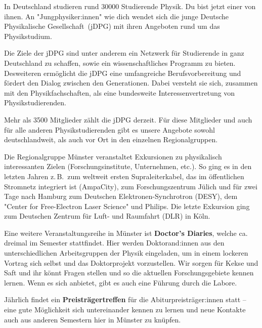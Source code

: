 \begin{multicols}{2}
In Deutschland studieren rund \num{30000} Studierende Physik.
Du bist jetzt einer von ihnen.
An "Jungphysiker:innen" wie dich wendet sich die junge Deutsche Physikalische Gesellschaft~(jDPG) mit ihren Angeboten rund um das Physikstudium.

Die Ziele der jDPG sind unter anderem ein Netzwerk für Studierende in ganz Deutschland zu schaffen, sowie ein wissenschaftliches Programm zu bieten.
Desweiteren ermöglicht die jDPG eine umfangreiche Berufsvorbereitung und fördert den Dialog zwischen den Generationen.
Dabei versteht sie sich, zusammen mit den Physikfachschaften, als eine bundesweite Interessenvertretung von Physikstudierenden.

Mehr als \num{3500} Mitglieder zählt die jDPG derzeit.
Für diese Mitglieder und auch für alle anderen Physikstudierenden gibt es unsere Angebote sowohl deutschlandweit, als auch vor Ort in den einzelnen Regionalgruppen.

Die Regionalgruppe Münster veranstaltet Exkursionen zu physikalisch interessanten Zielen (Forschungsinstitute, Unternehmen, etc.).
So ging es in den letzten Jahren z.\,B.\ zum weltweit ersten Supraleiterkabel, das im öffentlichen Stromnetz integriert ist (AmpaCity), zum Forschungszentrum Jülich und für zwei Tage nach Hamburg zum Deutschen Elektronen-Synchrotron (DESY), dem "Center for Free-Electron Laser Science" und Philips. Die letzte Exkursion ging zum Deutschen Zentrum für Luft- und Raumfahrt (DLR) in Köln.

Eine weitere Veranstaltungsreihe in Münster ist \textbf{Doctor's Diaries}, welche ca. dreimal im Semester stattfindet. Hier werden Doktorand:innen aus den unterschiedlichen Arbeitsgruppen der Physik eingeladen, um in einem lockeren Vortrag sich selbst und das Doktorprojekt vorzustellen. Wir sorgen für Kekse und Saft und ihr könnt Fragen stellen und so die aktuellen Forschungsgebiete kennen lernen. Wenn es sich anbietet, gibt es auch eine Führung durch die Labore. 

Jährlich findet ein \textbf{Preisträgertreffen} für die Abiturpreisträger:innen statt -- eine gute Möglichkeit sich untereinander kennen zu lernen und neue Kontakte auch aus anderen Semestern hier in Münster zu knüpfen.



\end{multicols}
